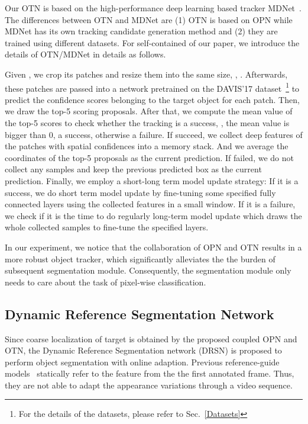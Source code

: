 \documentclass[10pt,twocolumn,letterpaper]{article}
\begin{document}
Our OTN is based on the high-performance deep learning based tracker MDNet~\cite{mdnet_cvpr16}. The differences between OTN and MDNet are (1) OTN is based on OPN while MDNet has its own tracking candidate generation method and (2) they are trained using different datasets. For self-contained of our paper, we introduce the details of OTN/MDNet in details as follows.

Given , we crop its patches and resize them into the same size, \eg, . Afterwards, these patches are passed into a network pretrained on the DAVIS'17 dataset~\footnote{For the details of the datasets, please refer to Sec.~\ref{Datasets}} to predict the confidence scores belonging to the target object for each patch. Then, we draw the top-5 scoring proposals. After that, we compute the mean value of the top-5 scores to check whether the tracking is a success, \ie, the mean value is bigger than 0, a success, otherwise a failure. If succeed, we collect deep features of the patches with spatial confidences into a memory stack. And we average the coordinates of the top-5 proposals as the current prediction. If failed, we do not collect any samples and keep the previous predicted box as the current prediction. Finally, we employ a short-long term model update strategy: If it is a success, we do short term model update by fine-tuning some specified fully connected layers using the collected features in a small window. If it is a failure, we check if it is the time to do regularly long-term model update which draws the whole collected samples to fine-tune the specified layers.

In our experiment, we notice that the collaboration of OPN and OTN results in a more robust object tracker, which significantly alleviates the the burden of subsequent segmentation module. Consequently, the segmentation module only needs to care about the task of pixel-wise classification.


\subsection{Dynamic Reference Segmentation Network} \label{DRSN}
Since coarse localization of target is obtained by the proposed coupled OPN and OTN, the Dynamic Reference Segmentation network (DRSN) is proposed to perform object segmentation with online adaption. Previous reference-guide models~\cite{rgmp_cvpr18, Yang2018osmn} statically refer to the feature from the the first annotated frame. Thus, they are not able to adapt the appearance variations through a video sequence. 
\end{document}
